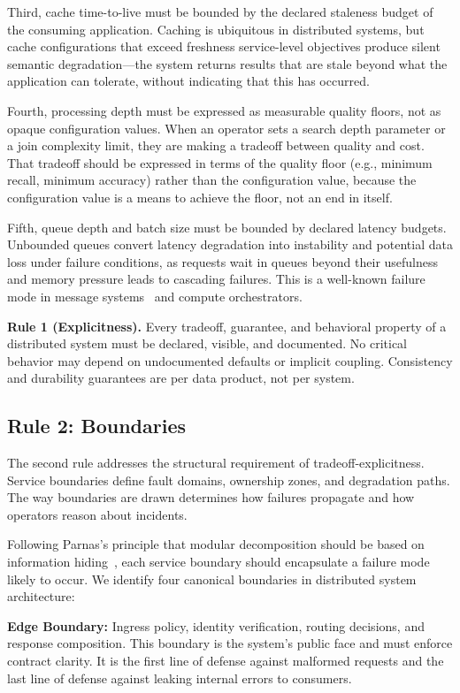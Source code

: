 \documentclass[conference]{IEEEtran}
\begin{document}
Third, cache time-to-live must be bounded by the declared staleness budget of the consuming application. Caching is ubiquitous in distributed systems, but cache configurations that exceed freshness service-level objectives produce silent semantic degradation---the system returns results that are stale beyond what the application can tolerate, without indicating that this has occurred.

Fourth, processing depth must be expressed as measurable quality floors, not as opaque configuration values. When an operator sets a search depth parameter or a join complexity limit, they are making a tradeoff between quality and cost. That tradeoff should be expressed in terms of the quality floor (e.g., minimum recall, minimum accuracy) rather than the configuration value, because the configuration value is a means to achieve the floor, not an end in itself.

Fifth, queue depth and batch size must be bounded by declared latency budgets. Unbounded queues convert latency degradation into instability and potential data loss under failure conditions, as requests wait in queues beyond their usefulness and memory pressure leads to cascading failures. This is a well-known failure mode in message systems~\cite{kafka} and compute orchestrators.

\textbf{Rule 1 (Explicitness).} Every tradeoff, guarantee, and behavioral property of a distributed system must be declared, visible, and documented. No critical behavior may depend on undocumented defaults or implicit coupling. Consistency and durability guarantees are per data product, not per system.

\subsection{Rule 2: Boundaries}

The second rule addresses the structural requirement of tradeoff-explicitness. Service boundaries define fault domains, ownership zones, and degradation paths. The way boundaries are drawn determines how failures propagate and how operators reason about incidents.

Following Parnas's principle that modular decomposition should be based on information hiding~\cite{parnas1972criteria}, each service boundary should encapsulate a failure mode likely to occur. We identify four canonical boundaries in distributed system architecture:

\textbf{Edge Boundary:} Ingress policy, identity verification, routing decisions, and response composition. This boundary is the system's public face and must enforce contract clarity. It is the first line of defense against malformed requests and the last line of defense against leaking internal errors to consumers.
\end{document}
